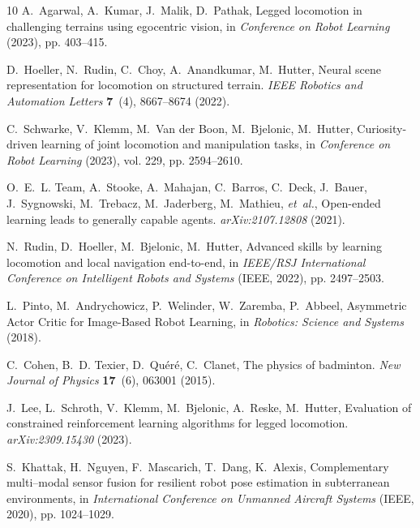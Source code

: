 \documentclass[9pt,twocolumn,twoside]{osajnl}
\begin{document}
\begin{thebibliography}{10}
    A.~{Agarwal}, A.~{Kumar}, J.~{Malik}, D.~{Pathak}, Legged locomotion in
      challenging terrains using egocentric vision, in \emph{Conference on Robot
      Learning} (2023), pp. 403--415.
    
    D.~{Hoeller}, N.~{Rudin}, C.~{Choy}, A.~{Anandkumar}, M.~{Hutter}, Neural scene
      representation for locomotion on structured terrain. \emph{IEEE Robotics and
      Automation Letters} \textbf{7}~(4), 8667--8674 (2022).
    
    C.~{Schwarke}, V.~{Klemm}, M.~{Van der Boon}, M.~{Bjelonic}, M.~{Hutter},
      Curiosity-driven learning of joint locomotion and manipulation tasks, in
      \emph{Conference on Robot Learning} (2023), vol. 229, pp. 2594--2610.
    
    O.~E.~L. {Team}, A.~{Stooke}, A.~{Mahajan}, C.~{Barros}, C.~{Deck}, J.~{Bauer},
      J.~{Sygnowski}, M.~{Trebacz}, M.~{Jaderberg}, M.~{Mathieu}, \emph{et~al.},
      Open-ended learning leads to generally capable agents.
      \emph{arXiv:2107.12808}  (2021).
    
    N.~{Rudin}, D.~{Hoeller}, M.~{Bjelonic}, M.~{Hutter}, Advanced skills by
      learning locomotion and local navigation end-to-end, in \emph{IEEE/RSJ
      International Conference on Intelligent Robots and Systems} (IEEE, 2022), pp.
      2497--2503.
    
    L.~{Pinto}, M.~{Andrychowicz}, P.~{Welinder}, W.~{Zaremba}, P.~{Abbeel},
      Asymmetric Actor Critic for Image-Based Robot Learning, in \emph{Robotics:
      Science and Systems} (2018).
    
    C.~{Cohen}, B.~D. {Texier}, D.~{Qu{\'e}r{\'e}}, C.~{Clanet}, The physics of
      badminton. \emph{New Journal of Physics} \textbf{17}~(6), 063001 (2015).
    
    J.~{Lee}, L.~{Schroth}, V.~{Klemm}, M.~{Bjelonic}, A.~{Reske}, M.~{Hutter},
      Evaluation of constrained reinforcement learning algorithms for legged
      locomotion. \emph{arXiv:2309.15430}  (2023).
    
    S.~{Khattak}, H.~{Nguyen}, F.~{Mascarich}, T.~{Dang}, K.~{Alexis},
      Complementary multi--modal sensor fusion for resilient robot pose estimation
      in subterranean environments, in \emph{International Conference on Unmanned
      Aircraft Systems} (IEEE, 2020), pp. 1024--1029.
    

\end{thebibliography}
\end{document}
